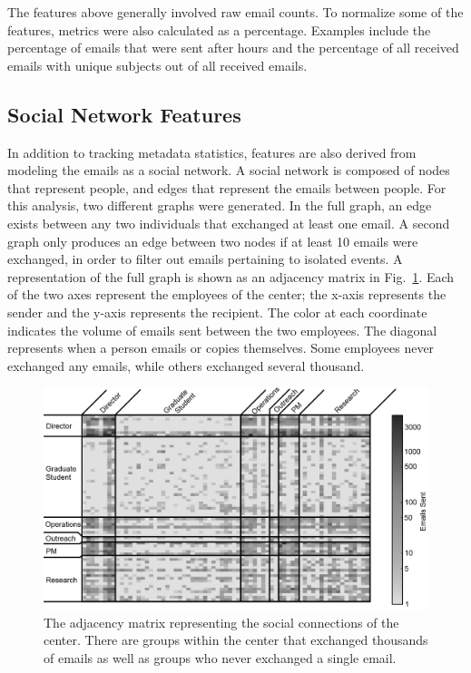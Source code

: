 \documentclass[10pt,twocolumn,conference]{IEEEtran}
\begin{document}
The features above generally involved raw email counts.
To normalize some of the features, metrics were also calculated as a percentage.
Examples include the percentage of emails that were sent after hours and the percentage of all received emails with unique subjects out of all received emails.

\subsection{Social Network Features}
In addition to tracking metadata statistics, features are also derived from modeling the emails as a social network.
A social network is composed of nodes that represent people, and edges that represent the emails between people.  For this analysis, two different graphs were generated.
In the full graph, an edge exists between any two individuals that exchanged at least one email.
A second graph only produces an edge between two nodes if at least 10 emails were exchanged, in order to filter out emails pertaining to isolated events.
A representation of the full graph is shown as an adjacency matrix in Fig.~\ref{fig:adj_matrix}.
Each of the two axes represent the employees of the center; the x-axis represents the sender and the y-axis represents the recipient.
The color at each coordinate indicates the volume of emails sent between the two employees.
The diagonal represents when a person emails or copies themselves.
Some employees never exchanged any emails, while others exchanged several thousand.

\begin{figure}[t]
    \centering
    \includegraphics[width=\columnwidth,trim={0mm 0mm 0mm 0mm},clip]{GrayBiggerFont}
    \caption{The adjacency matrix representing the social connections of the center.  There are groups within the center that exchanged thousands of emails as well as groups who never exchanged a single email.}
    \label{fig:adj_matrix}
\end{figure}
\end{document}
